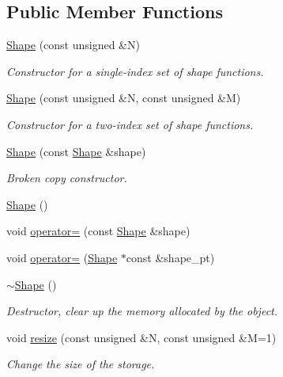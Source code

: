 \subsection*{Public Member Functions}
\begin{DoxyCompactItemize}
\item 
\hyperlink{classoomph_1_1Shape_aedb62dd7998071721057eab955ecc1f9}{Shape} (const unsigned \&N)
\begin{DoxyCompactList}\small\item\em Constructor for a single-\/index set of shape functions. \end{DoxyCompactList}\item 
\hyperlink{classoomph_1_1Shape_ad892f46ca3265ba654bb4df164890505}{Shape} (const unsigned \&N, const unsigned \&M)
\begin{DoxyCompactList}\small\item\em Constructor for a two-\/index set of shape functions. \end{DoxyCompactList}\item 
\hyperlink{classoomph_1_1Shape_aef6de818ca2298d6a7db1b2175bb94fa}{Shape} (const \hyperlink{classoomph_1_1Shape}{Shape} \&shape)
\begin{DoxyCompactList}\small\item\em Broken copy constructor. \end{DoxyCompactList}\item 
\hyperlink{classoomph_1_1Shape_af6d7a3572de5743ca382d275711a814e}{Shape} ()
\item 
void \hyperlink{classoomph_1_1Shape_aa9d3d4203abf1e39fc3db2732355c801}{operator=} (const \hyperlink{classoomph_1_1Shape}{Shape} \&shape)
\item 
void \hyperlink{classoomph_1_1Shape_ae56db76f6d0b46acb57869896dc9be20}{operator=} (\hyperlink{classoomph_1_1Shape}{Shape} $\ast$const \&shape\+\_\+pt)
\item 
\hyperlink{classoomph_1_1Shape_af6e38eb7b8c072b0acac31c61f11cc27}{$\sim$\+Shape} ()
\begin{DoxyCompactList}\small\item\em Destructor, clear up the memory allocated by the object. \end{DoxyCompactList}\item 
void \hyperlink{classoomph_1_1Shape_a701caf3197248f0e4f598ede06f0d4ec}{resize} (const unsigned \&N, const unsigned \&M=1)
\begin{DoxyCompactList}\small\item\em Change the size of the storage. \end{DoxyCompactList}\item 

\end{DoxyCompactItemize}
